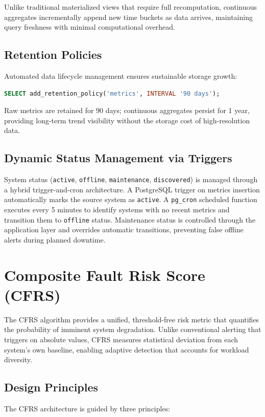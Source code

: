 \documentclass{ieeeaccess}
\begin{document}
Unlike traditional materialized views that require full recomputation, continuous aggregates incrementally append new time buckets as data arrives, maintaining query freshness with minimal computational overhead.

\subsection{Retention Policies}
Automated data lifecycle management ensures sustainable storage growth:

\begin{lstlisting}[language=SQL]
SELECT add_retention_policy('metrics', INTERVAL '90 days');
\end{lstlisting}

Raw metrics are retained for 90 days; continuous aggregates persist for 1 year, providing long-term trend visibility without the storage cost of high-resolution data.

\subsection{Dynamic Status Management via Triggers}
System status (\texttt{active}, \texttt{offline}, \texttt{maintenance}, \texttt{discovered}) is managed through a hybrid trigger-and-cron architecture. A PostgreSQL trigger on metrics insertion automatically marks the source system as \texttt{active}. A \texttt{pg\_cron} scheduled function executes every 5 minutes to identify systems with no recent metrics and transition them to \texttt{offline} status. Maintenance status is controlled through the application layer and overrides automatic transitions, preventing false offline alerts during planned downtime.


\section{Composite Fault Risk Score (CFRS)}
\label{sec:cfrs}
The CFRS algorithm provides a unified, threshold-free risk metric that quantifies the probability of imminent system degradation. Unlike conventional alerting that triggers on absolute values, CFRS measures statistical deviation from each system's own baseline, enabling adaptive detection that accounts for workload diversity.

\subsection{Design Principles}
The CFRS architecture is guided by three principles:
\end{document}
